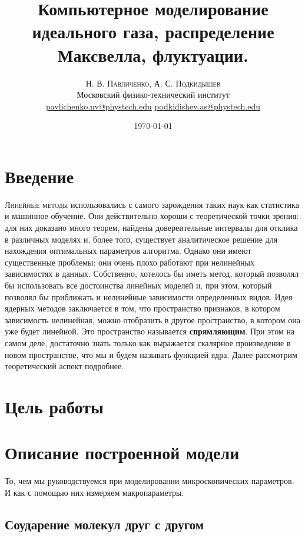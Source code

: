 \documentclass[twoside,twocolumn]{article}
\title{Компьютерное моделирование идеального газа, распределение Максвелла, флуктуации.} %
\author{%
\textsc{Н. В. Павличенко, А. С. Подкидышев} \\[1ex] %
\normalsize Московский физико-технический институт \\ %
\normalsize \href{mailto:pavlichenko.nv@phystech.edu}{pavlichenko.nv@phystech.edu}
\href{mailto:pavlichenko.nv@phystech.edu}{podkidishev.as@phystech.edu}%
}
\date{\today} %
\theoremstyle{plain}
\theoremstyle{definition}
\begin{document}
\maketitle

\section{Введение}

\lettrine[nindent=0em,lines=3]{Л} {инейные методы} использовались с самого зарождения таких наук как статистика и машинное обучение.
 Они действительно хороши с теоретической точки зрения: для них доказано много теорем, найдены
довереительные интервалы для отклика в различных моделях и, более того, существует аналитическое решение для нахождения
оптимальных параметров алгоритма. Однако они имеют существенные проблемы: они очень плохо работают при нелинейных
зависимостях в данных. Собственно, хотелось бы иметь метод, который позволял бы использовать все достоинства линейных моделей
и, при этом, который позволял бы приближать и нелинейные зависимости определенных видов. Идея ядерных методов заключается в
том, что пространство признаков, в котором зависимость нелинейная, можно отобразить в другое пространство, в котором она уже
будет линейной. Это пространство называется \textbf{спрямляющим}. При этом на самом деле, достаточно знать только как выражается скалярное
произведение в новом пространстве, что мы и будем называть функцией ядра. Далее рассмотрим теоретический аспект подробнее.

\section{Цель работы}

\section{Описание построенной модели}

\indent То, чем мы руководствуемся при моделировании микроскопических параметров. И как с помощью них измеряем макропараметры.

\subsection{Соударение молекул друг с другом}
\end{document}
